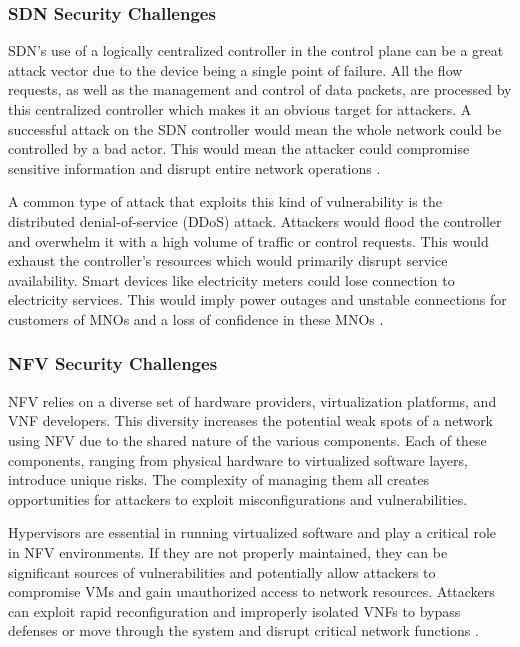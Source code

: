 \documentclass[acmtog]{acmart}
\begin{document}
\subsubsection{SDN Security Challenges}
SDN’s use of a logically centralized controller in the control plane can be a great attack vector due to the device being a single point of failure. All the flow requests, as well as the management and control of data packets, are processed by this centralized controller which makes it an obvious target for attackers. A successful attack on the SDN controller would mean the whole network could be controlled by a bad actor. This would mean the attacker could compromise sensitive information and disrupt entire network operations \cite{ref6}. \cite{Lee05}

A common type of attack that exploits this kind of vulnerability is the distributed denial-of-service (DDoS) attack. Attackers would flood the controller and overwhelm it with a high volume of traffic or control requests. This would exhaust the controller's resources which would primarily disrupt service availability. Smart devices like electricity meters could lose connection to electricity services. This would imply power outages and unstable connections for customers of MNOs and a loss of confidence in these MNOs \cite{ref3}.

\subsubsection{NFV Security Challenges}
NFV relies on a diverse set of hardware providers, virtualization platforms, and VNF developers. This diversity increases the potential weak spots of a network using NFV due to the shared nature of the various components. Each of these components, ranging from physical hardware to virtualized software layers, introduce unique risks. The complexity of managing them all creates opportunities for attackers to exploit misconfigurations and vulnerabilities. 

Hypervisors are essential in running virtualized software and play a critical role in NFV environments. If they are not properly maintained, they can be significant sources of vulnerabilities and potentially allow attackers to compromise VMs and gain unauthorized access to network resources. Attackers can exploit rapid reconfiguration and improperly isolated VNFs to bypass defenses or move through the system and disrupt critical network functions \cite{ref3_1}.
\end{document}
